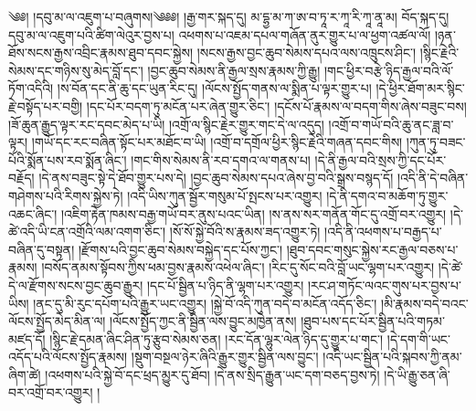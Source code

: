 \setcounter{footnote}{0} 
༄༅། །དབུ་མ་ལ་འཇུག་པ་བཞུགས།༄༅༅།    །རྒྱ་གར་སྐད་དུ། མ་དྷྱ་མ་ཀ་ཨ་བ་ཏཱ་ར་ཀཱ་རི་ཀཱ་ནཱ་མ། བོད་སྐད་དུ། དབུ་མ་ལ་འཇུག་པའི་ཚིག་ལེའུར་བྱས་པ། འཕགས་པ་འཇམ་དཔལ་གཞོན་ནུར་གྱུར་པ་ལ་ཕྱག་འཚལ་ལོ། །ཉན་ཐོས་སངས་རྒྱས་འབྲིང་རྣམས་ཐུབ་དབང་སྐྱེས། །སངས་རྒྱས་བྱང་ཆུབ་སེམས་དཔའ་ལས་འཁྲུངས་ཤིང་། །སྙིང་རྗེའི་སེམས་དང་གཉིས་སུ་མེད་བློ་དང་། །བྱང་ཆུབ་སེམས་ནི་རྒྱལ་སྲས་རྣམས་ཀྱི་རྒྱུ། །གང་ཕྱིར་བརྩེ་ཉིད་རྒྱལ་བའི་ལོ་ཏོག་འདིའི། །ས་བོན་དང་ནི་ཆུ་དང་ཡུན་རིང་དུ། །ལོངས་སྤྱོད་གནས་ལ་སྨིན་པ་ལྟར་གྱུར་པ། །དེ་ཕྱིར་ཐོག་མར་སྙིང་རྗེ་བསྟོད་པར་བགྱི། །དང་པོར་བདག་ཏུ་མངོན་པར་ཞེན་གྱུར་ཅིང་། །དངོས་པོ་རྣམས་ལ་བདག་གིས་ཞེས་བཟུང་བས། །ཟོ་ཆུན་རྒྱུད་ལྟར་རང་དབང་མེད་པ་ཡི། །འགྲོ་ལ་སྙིང་རྗེར་གྱུར་གང་དེ་ལ་འདུད། །འགྲོ་བ་གཡོ་བའི་ཆུ་ནང་ཟླ་བ་ལྟར། །གཡོ་དང་རང་བཞིན་སྟོང་པར་མཐོང་བ་ཡི། །འགྲོ་བ་དགྲོལ་ཕྱིར་སྙིང་རྗེའི་གཞན་དབང་གིས། །ཀུན་ཏུ་བཟང་པོའི་སྨོན་པས་རབ་སྨོན་ཞིང་། །གང་གིས་སེམས་ནི་རབ་དགའ་ལ་གནས་པ། །དེ་ནི་རྒྱལ་བའི་སྲས་ཀྱི་དང་པོར་བརྗོད། །དེ་ནས་བཟུང་སྟེ་དེ་ཐོབ་གྱུར་པས་དེ། །བྱང་ཆུབ་སེམས་དཔའ་ཞེས་བྱ་བའི་སྒྲས་བསྙད་དོ། །འདི་ནི་དེ་བཞིན་གཤེགས་པའི་རིགས་སྐྱེས་ཏེ། །འདི་ཡིས་ཀུན་སྦྱོར་གསུམ་པོ་སྤངས་པར་འགྱུར། །དེ་ནི་དགའ་བ་མཆོག་ཏུ་གྱུར་འཆང་ཞིང་། །འཇིག་རྟེན་ཁམས་བརྒྱ་གཡོ་བར་ནུས་པའང་ཡིན། །ས་ནས་སར་གནོན་གོང་དུ་འགྲོ་བར་འགྱུར། །དེ་ཚེ་འདི་ཡི་ངན་འགྲོའི་ལམ་འགག་ཅིང་། །སོ་སོ་སྐྱེ་བོའི་ས་རྣམས་ཟད་འགྱུར་ཏེ། །འདི་ནི་འཕགས་པ་བརྒྱད་པ་བཞིན་དུ་བསྟན། །རྫོགས་པའི་བྱང་ཆུབ་སེམས་བསྐྱེད་དང་པོས་ཀྱང་། །ཐུབ་དབང་གསུང་སྐྱེས་རང་རྒྱལ་བཅས་པ་རྣམས། །བསོད་ནམས་སྟོབས་ཀྱིས་ཕམ་བྱས་རྣམས་འཕེལ་ཞིང་། །རིང་དུ་སོང་བའི་བློ་ཡང་ལྷག་པར་འགྱུར། །དེ་ཚེ་དེ་ལ་རྫོགས་སངས་བྱང་ཆུབ་རྒྱུར། །དང་པོ་སྦྱིན་པ་ཉིད་ནི་ལྷག་པར་འགྱུར། །རང་ཤ་གཏོང་ལའང་གུས་པར་བྱས་པ་ཡིས། །ནང་དུ་མི་རུང་དཔོག་པའི་རྒྱུར་ཡང་འགྱུར། །སྐྱེ་བོ་འདི་ཀུན་བདེ་བ་མངོན་འདོད་ཅིང་། །མི་རྣམས་བདེ་བའང་ལོངས་སྤྱོད་མེད་མིན་ལ། །ལོངས་སྤྱོད་ཀྱང་ནི་སྦྱིན་ལས་བྱུང་མཁྱེན་ནས། །ཐུབ་པས་དང་པོར་སྦྱིན་པའི་གཏམ་མཛད་དོ། །སྙིང་རྗེ་དམན་ཞིང་ཤིན་ཏུ་རྩུབ་སེམས་ཅན། །རང་དོན་ལྷུར་ལེན་ཉིད་དུ་གྱུར་པ་གང་། །དེ་དག་གི་ཡང་འདོད་པའི་ལོངས་སྤྱོད་རྣམས། །སྡུག་བསྔལ་ཉེར་ཞིའི་རྒྱུར་གྱུར་སྦྱིན་ལས་བྱུང་། །འདི་ཡང་སྦྱིན་པའི་སྐབས་ཀྱི་ནམ་ཞིག་ཚེ། །འཕགས་པའི་སྐྱེ་བོ་དང་ཕྲད་མྱུར་དུ་ཐོབ། །དེ་ནས་སྲིད་རྒྱུན་ཡང་དག་བཅད་བྱས་ཏེ། །དེ་ཡི་རྒྱུ་ཅན་ཞི་བར་འགྲོ་བར་འགྱུར། །
